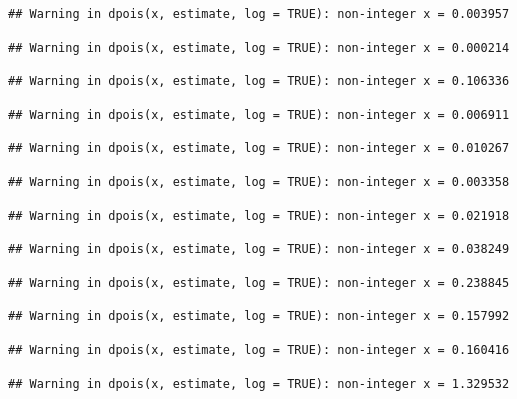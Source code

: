 \documentclass[]{article}
\begin{document}
\begin{verbatim}
## Warning in dpois(x, estimate, log = TRUE): non-integer x = 0.003957
\end{verbatim}

\begin{verbatim}
## Warning in dpois(x, estimate, log = TRUE): non-integer x = 0.000214
\end{verbatim}

\begin{verbatim}
## Warning in dpois(x, estimate, log = TRUE): non-integer x = 0.106336
\end{verbatim}

\begin{verbatim}
## Warning in dpois(x, estimate, log = TRUE): non-integer x = 0.006911
\end{verbatim}

\begin{verbatim}
## Warning in dpois(x, estimate, log = TRUE): non-integer x = 0.010267
\end{verbatim}

\begin{verbatim}
## Warning in dpois(x, estimate, log = TRUE): non-integer x = 0.003358
\end{verbatim}

\begin{verbatim}
## Warning in dpois(x, estimate, log = TRUE): non-integer x = 0.021918
\end{verbatim}

\begin{verbatim}
## Warning in dpois(x, estimate, log = TRUE): non-integer x = 0.038249
\end{verbatim}

\begin{verbatim}
## Warning in dpois(x, estimate, log = TRUE): non-integer x = 0.238845
\end{verbatim}

\begin{verbatim}
## Warning in dpois(x, estimate, log = TRUE): non-integer x = 0.157992
\end{verbatim}

\begin{verbatim}
## Warning in dpois(x, estimate, log = TRUE): non-integer x = 0.160416
\end{verbatim}

\begin{verbatim}
## Warning in dpois(x, estimate, log = TRUE): non-integer x = 1.329532
\end{verbatim}
\end{document}
